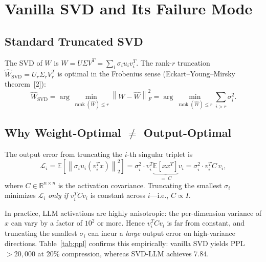 \documentclass[11pt,a4paper]{article}
\DeclareMathOperator{\rank}{rank}
\newcommand{\Rbb}{\mathbb{R}}
\newcommand{\Ebb}{\mathbb{E}}
\newcommand{\norm}[1]{\left\|#1\right\|}
\theoremstyle{remark}
\begin{document}
\section{Vanilla SVD and Its Failure Mode}
\label{sec:vanilla}

\subsection{Standard Truncated SVD}

The SVD of $W$ is $W = U\Sigma V^T = \sum_i \sigma_i u_i v_i^T$.
The rank-$r$ truncation
$\hat{W}_{\text{SVD}} = U_r\Sigma_r V_r^T$
is optimal in the Frobenius sense (Eckart--Young--Mirsky theorem~[2]):
\begin{equation}
  \hat{W}_{\text{SVD}} = \arg\min_{\rank(\hat{W})\le r} \norm{W-\hat{W}}_F^2
  = \arg\min_{\rank(\hat{W})\le r} \sum_{i>r}\sigma_i^2.
\end{equation}

\subsection{Why Weight-Optimal $\neq$ Output-Optimal}

The output error from truncating the $i$-th singular triplet is
\begin{equation}
  \label{eq:loss_i}
  \mathcal{L}_i
  = \Ebb\!\left[\norm{\sigma_i u_i (v_i^T x)}_2^2\right]
  = \sigma_i^2 \cdot v_i^T \underbrace{\Ebb[xx^T]}_{=\;C} v_i
  = \sigma_i^2 \cdot v_i^T C\, v_i,
\end{equation}
where $C \in \Rbb^{n\times n}$ is the activation covariance.  Truncating the
smallest $\sigma_i$ minimizes $\mathcal{L}_i$ \emph{only if} $v_i^T C v_i$ is
constant across $i$---i.e., $C \propto I$.

\begin{tcolorbox}[keybox={The problem with LLMs}]
In practice, LLM activations are highly anisotropic: the per-dimension
variance of $x$ can vary by a factor of $10^2$ or more.  Hence $v_i^T C v_i$
is far from constant, and truncating the smallest $\sigma_i$ can incur a
\emph{large} output error on high-variance directions.  Table~\ref{tab:ppl}
confirms this empirically: vanilla SVD yields PPL $>20{,}000$ at 20\%
compression, whereas SVD-LLM achieves 7.84.
\end{tcolorbox}
\end{document}
